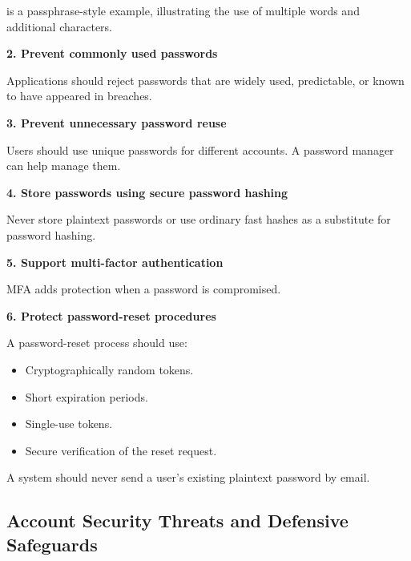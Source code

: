 is a passphrase-style example, illustrating the use of multiple words and additional characters.

\textbf{2. Prevent commonly used passwords}

Applications should reject passwords that are widely used, predictable, or known to have appeared in breaches.

\textbf{3. Prevent unnecessary password reuse}

Users should use unique passwords for different accounts. A password manager can help manage them.

\textbf{4. Store passwords using secure password hashing}

Never store plaintext passwords or use ordinary fast hashes as a substitute for password hashing.

\textbf{5. Support multi-factor authentication}

MFA adds protection when a password is compromised.

\textbf{6. Protect password-reset procedures}

A password-reset process should use:

\begin{itemize}
\item Cryptographically random tokens.
\item Short expiration periods.
\item Single-use tokens.
\item Secure verification of the reset request.
\end{itemize}

A system should never send a user's existing plaintext password by email.

\subsection{Account Security Threats and Defensive Safeguards}

